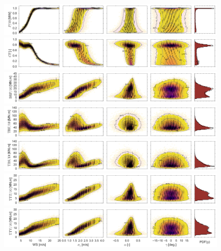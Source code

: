 \documentclass[preprint,12pt]{elsarticle}
\begin{document}
\begin{figure}[p]
\begin{centering}
\includegraphics[width=\linewidth]{Figures/Full_surrogate_red_file/P_PCE_MC_surrogate_last_row.jpg} \\
\includegraphics[width=\linewidth]{Figures/Full_surrogate_red_file/CT_PCE_MC_surrogate_last_row.jpg} \\
\includegraphics[width=\linewidth]{Figures/Full_surrogate_red_file/BRFBM_EFL_M12_PCE_MC_surrogate_last_row.jpg} \\
\includegraphics[width=\linewidth]{Figures/Full_surrogate_red_file/TBFBM_EFL_M4_PCE_MC_surrogate_last_row.jpg} \\
\includegraphics[width=\linewidth]{Figures/Full_surrogate_red_file/TBSBM_EFL_M4_PCE_MC_surrogate_last_row.jpg} \\
\includegraphics[width=\linewidth]{Figures/Full_surrogate_red_file/TTTBM_EFL_M4_PCE_MC_surrogate_last_row.jpg} \\
\includegraphics[width=\linewidth]{Figures/Full_surrogate_red_file/TTYBM_EFL_M4_PCE_MC_surrogate_last_row.jpg}

\end{centering}
\end{figure}
\end{document}
